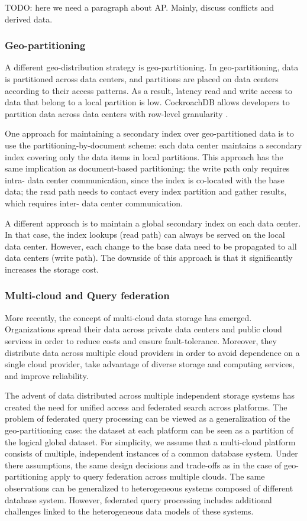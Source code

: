 \medskip

TODO: here we need a paragraph about AP.
Mainly, discuss conflicts and derived data.

\subsubsection{Geo-partitioning}
A different geo-distribution strategy is geo-partitioning.
In geo-partitioning, data is partitioned across data centers, and partitions are placed on data centers according to
their access patterns.
As a result, latency read and write access to data that belong to a local partition is low.
CockroachDB allows developers to partition data across data centers with row-level granularity
\cite{cockroachdb:geopartitioning}.

One approach for maintaining a secondary index over geo-partitioned data is to use the partitioning-by-document scheme:
each data center maintains a secondary index covering only the data items in local partitions.
This approach has the same implication as document-based partitioning:
the write path only requires intra- data center communication, since the index is co-located with the base data;
the read path needs to contact every index partition and gather results, which requires inter- data center
communication.

A different approach is to maintain a global secondary index on each data center.
In that case, the index lookups (read path) can always be served on the local data center.
However, each change to the base data need to be propagated to all data centers (write path).
The downside of this approach is that it significantly increases the storage cost.

\subsubsection{Multi-cloud and Query federation}
More recently, the concept of multi-cloud data storage has emerged.
Organizations spread their data across private data centers and public cloud services in order to reduce costs and
ensure fault-tolerance.
Moreover, they distribute data across multiple cloud providers in order to avoid dependence on a single
cloud provider, take advantage of diverse storage and computing services, and improve reliability.

The advent of data distributed across multiple independent storage systems has created the need for unified access and
federated search across platforms.
The problem of federated query processing can be viewed as a generalization of the geo-partitioning case:
the dataset at each platform can be seen as a partition of the logical global dataset.
For simplicity, we assume that a multi-cloud platform consists of multiple, independent instances of a common database
system.
Under there assumptions, the same design decisions and trade-offs as in the case of geo-partitioning apply to query
federation across multiple clouds.
The same observations can be generalized to heterogeneous systems composed of different database system.
However, federated query processing includes additional challenges linked to the heterogeneous data models of these
systems.

